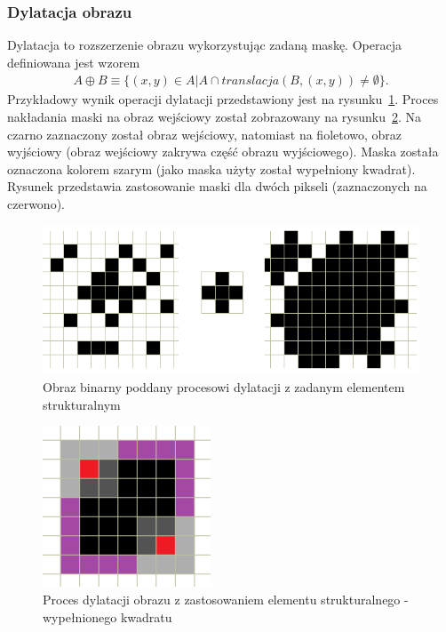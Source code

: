 \subsubsection{Dylatacja obrazu}
Dylatacja to rozszerzenie obrazu wykorzystując zadaną maskę. Operacja definiowana jest wzorem
\begin{gather*}
  A \oplus B \equiv \{ (x, y) \in A | A \cap translacja(B, (x, y)) \neq \emptyset \}.
\end{gather*}
Przykładowy wynik operacji dylatacji przedstawiony jest na rysunku~\ref{fig:dilate}. Proces nakładania maski na obraz wejściowy został zobrazowany na rysunku~\ref{fig:dilate_better_example}. Na czarno zaznaczony został obraz wejściowy, natomiast na fioletowo, obraz wyjściowy (obraz wejściowy zakrywa część obrazu wyjściowego). Maska została oznaczona kolorem szarym (jako maska użyty został wypełniony kwadrat). Rysunek przedstawia zastosowanie maski dla dwóch pikseli (zaznaczonych na czerwono).
\begin{figure}
  \centering
  \includegraphics[width=15cm]{img/dilate}
  \caption{Obraz binarny poddany procesowi dylatacji z zadanym elementem strukturalnym}
  \label{fig:dilate}
\end{figure}
\begin{figure}
  \centering
  \includegraphics[width=5cm]{img/dilate-better-example}
  \caption{Proces dylatacji obrazu z zastosowaniem elementu strukturalnego - wypełnionego kwadratu}
  \label{fig:dilate_better_example}
\end{figure}

